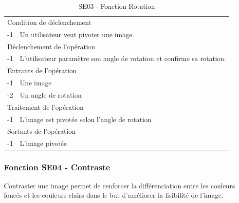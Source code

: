 \documentclass[a4paper]{article}
\begin{document}
\begin{table}[H]
  \centering
   \small
	\begin{tabular}{|c|p{12cm}|}
   		\hline
   			\rowcolor{lightgray}\multicolumn{2}{|c|}{\textbf{SE03 - Fonction Rotation}} \\
   		\hline
   			\multicolumn{2}{|l|}{Condition de d\'eclenchement} \\
   		\hline
   			-1 & Un utilisateur veut pivoter une image. \\
   		\hline
   			\multicolumn{2}{|l|}{D\'eclenchement de l'op\'eration} \\
   		\hline
   			-1 & L'utilisateur paramètre son angle de rotation et confirme sa rotation. \\
   		\hline
   			\multicolumn{2}{|l|}{Entrants de l'op\'eration} \\
   		\hline
        	-1 & Une image \\
   			-2 & Un angle de rotation \\ 	
        \hline
   			\multicolumn{2}{|l|}{Traitement de l'op\'eration} \\
  		\hline
   			-1 & L'image est pivotée selon l'angle de rotation \\
   		\hline
   			\multicolumn{2}{|l|}{Sortants de l'op\'eration} \\
   		\hline
   			-1 & L'image pivotée \\
   		\hline
	\end{tabular}
  \caption{SE03 - Fonction Rotation}
  \normalsize
  \label{tab:visu_img_rotation}
\end{table}


\subsubsection{Fonction SE04 - Contraste}

Contraster une image permet de renforcer la différenciation entre les couleurs foncés et les couleurs clairs dans le but d'améliorer la lisibilité de l'image.
\end{document}
